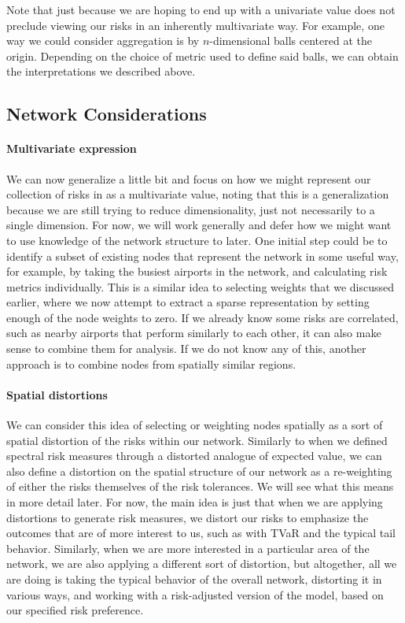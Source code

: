 Note that just because we are hoping to end up with a univariate value does not preclude viewing our risks in an inherently multivariate way. For example, one way we could consider aggregation is by $n$-dimensional balls centered at the origin. Depending on the choice of metric used to define said balls, we can obtain the interpretations we described above.


\subsection{Network Considerations}

\paragraph{Multivariate expression} We can now generalize a little bit and focus on how we might represent our collection of risks in as a multivariate value, noting that this is a generalization because we are still trying to reduce dimensionality, just not necessarily to a single dimension. For now, we will work generally and defer how we might want to use knowledge of the network structure to later. One initial step could be to identify a subset of existing nodes that represent the network in some useful way, for example, by taking the busiest airports in the network, and calculating risk metrics individually. This is a similar idea to selecting weights that we discussed earlier, where we now attempt to extract a sparse representation by setting enough of the node weights to zero. If we already know some risks are correlated, such as nearby airports that perform similarly to each other, it can also make sense to combine them for analysis. If we do not know any of this, another approach is to combine nodes from spatially similar regions.

\paragraph{Spatial distortions} We can consider this idea of selecting or weighting nodes spatially as a sort of spatial distortion of the risks within our network. Similarly to when we defined spectral risk measures through a distorted analogue of expected value, we can also define a distortion on the spatial structure of our network as a re-weighting of either the risks themselves of the risk tolerances. We will see what this means in more detail later. For now, the main idea is just that when we are applying distortions to generate risk measures, we distort our risks to emphasize the outcomes that are of more interest to us, such as with TVaR and the typical tail behavior. Similarly, when we are more interested in a particular area of the network, we are also applying a different sort of distortion, but altogether, all we are doing is taking the typical behavior of the overall network, distorting it in various ways, and working with a risk-adjusted version of the model, based on our specified risk preference.

